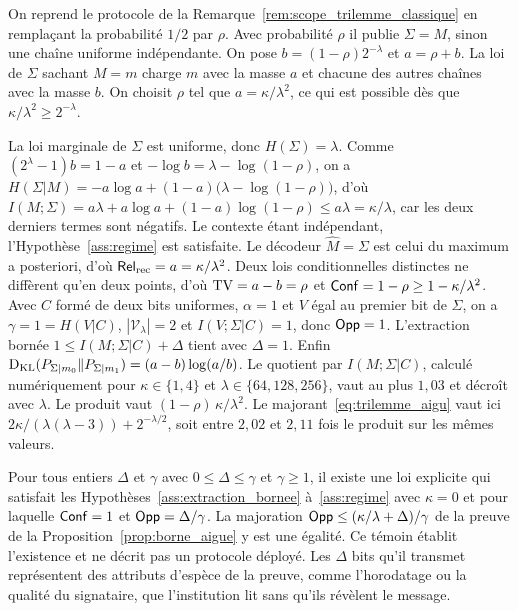 \begin{sloppypar}
\begin{Preuve}
On reprend le protocole de la Remarque~\ref{rem:scope_trilemme_classique} en
rempla\c{c}ant la probabilit\'e $1/2$ par $\rho$. Avec probabilit\'e $\rho$ il publie
$\Sigma = M$, sinon une cha\^ine uniforme ind\'ependante. On pose
$b = (1-\rho)2^{-\lambda}$ et $a = \rho + b$. La loi de $\Sigma$ sachant $M = m$ charge
$m$ avec la masse $a$ et chacune des autres cha\^ines avec la masse $b$. On choisit
$\rho$ tel que $a = \kappa/\lambda^2$, ce qui est possible d\`es que
$\kappa/\lambda^2 \geq 2^{-\lambda}$.

La loi marginale de $\Sigma$ est uniforme, donc $H(\Sigma) = \lambda$. Comme
$(2^\lambda-1)b = 1-a$ et $-\log b = \lambda - \log(1-\rho)$, on a
$H(\Sigma|M) = -a\log a + (1-a)\bigl(\lambda - \log(1-\rho)\bigr)$, d'o\`u
$I(M;\Sigma) = a\lambda + a\log a + (1-a)\log(1-\rho) \leq a\lambda = \kappa/\lambda$, car
les deux derniers termes sont n\'egatifs. Le contexte \'etant ind\'ependant,
l'Hypoth\`ese~\ref{ass:regime} est satisfaite. Le d\'ecodeur $\hat M = \Sigma$ est celui
du maximum a posteriori, d'o\`u $\mathsf{Rel}_{\mathrm{rec}} = a = \kappa/\lambda^2$. Deux lois
conditionnelles distinctes ne diff\`erent qu'en deux points, d'o\`u
$\operatorname{TV} = a - b = \rho$ et $\mathsf{Conf} = 1 - \rho \geq 1 - \kappa/\lambda^2$. Avec $C$ form\'e
de deux bits uniformes, $\alpha = 1$ et $V$ \'egal au premier bit de $\Sigma$, on a
$\gamma = 1 = H(V|C)$, $|\mathcal{V}_\lambda| = 2$ et $I(V;\Sigma|C) = 1$, donc $\mathsf{Opp} = 1$.
L'extraction born\'ee $1 \leq I(M;\Sigma|C) + \Delta$ tient avec $\Delta = 1$. Enfin
$\operatorname{D_{\text{KL}}}(P_{\Sigma|m_0}\|P_{\Sigma|m_1}) = (a-b)\log(a/b)$. Le quotient par
$I(M;\Sigma|C)$, calcul\'e num\'eriquement pour $\kappa \in \{1,4\}$ et
$\lambda \in \{64,128,256\}$, vaut au plus $1{,}03$ et d\'ecro\^it avec $\lambda$. Le produit
vaut $(1-\rho)\,\kappa/\lambda^2$. Le majorant~\eqref{eq:trilemme_aigu} vaut ici
$2\kappa/(\lambda(\lambda-3)) + 2^{-\lambda/2}$, soit entre $2{,}02$ et $2{,}11$ fois le
produit sur les m\^emes valeurs.
\end{Preuve}

\begin{remark}
\label{rem:temoin_realisable}
Pour tous entiers $\Delta$ et $\gamma$ avec $0 \leq \Delta \leq \gamma$ et $\gamma \geq 1$, il
existe une loi explicite qui satisfait les Hypoth\`eses~\ref{ass:extraction_bornee}
\`a~\ref{ass:regime} avec $\kappa = 0$ et pour laquelle $\mathsf{Conf} = 1$ et
$\mathsf{Opp} = \Delta/\gamma$. La majoration $\mathsf{Opp} \leq (\kappa/\lambda + \Delta)/\gamma$ de la
preuve de la Proposition~\ref{prop:borne_aigue} y est une \'egalit\'e. Ce t\'emoin
\'etablit l'existence et ne d\'ecrit pas un protocole d\'eploy\'e. Les $\Delta$ bits qu'il
transmet repr\'esentent des attributs d'esp\`ece de la preuve, comme l'horodatage ou la
qualit\'e du signataire, que l'institution lit sans qu'ils r\'ev\`elent le message.
\end{remark}


\end{sloppypar}
